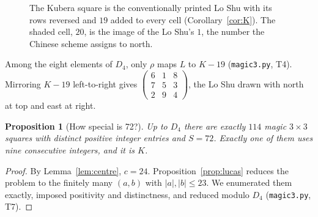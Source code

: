 \documentclass[pdflatex,sn-basic]{sn-jnl}
\theoremstyle{thmstyleone}
\newtheorem{proposition}[theorem]{Proposition}
\theoremstyle{thmstylethree}
\newcommand{\sq}[9]{\begin{smallmatrix}#1&#2&#3\\#4&#5&#6\\#7&#8&#9\end{smallmatrix}}
\begin{document}
\begin{figure}[t]
\centering
{}
\caption{The Kubera square is the conventionally printed Lo Shu with its rows reversed and $19$ added to every cell (Corollary~\ref{cor:K}). The shaded cell, $20$, is the image of the Lo Shu's $1$, the number the Chinese scheme assigns to north.}
\label{fig:LtoK}
\end{figure}
\noindent Among the eight elements of $D_4$, only $\rho$ maps $L$ to $K-19$ (\texttt{magic3.py}, T4). Mirroring $K-19$ left-to-right gives $\left(\sq{6}{1}{8}{7}{5}{3}{2}{9}{4}\right)$, the Lo Shu drawn with north at top and east at right.

\begin{proposition}[How special is 72?]\label{prop:count72}
Up to $D_4$ there are exactly $114$ magic $3\times3$ squares with distinct positive integer entries and $S=72$. Exactly one of them uses nine consecutive integers, and it is $K$.
\end{proposition}
\begin{proof}
By Lemma~\ref{lem:centre}, $c=24$. Proposition~\ref{prop:lucas} reduces the problem to the finitely many $(a,b)$ with $|a|,|b|\le23$. We enumerated them exactly, imposed positivity and distinctness, and reduced modulo $D_4$ (\texttt{magic3.py}, T7).
\end{proof}
\end{document}
